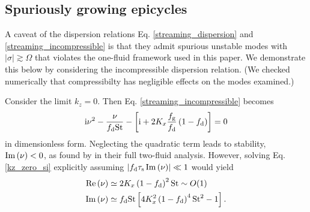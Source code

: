 \subsection{Spuriously growing epicycles}\label{spurious_epi}

A caveat of the dispersion relations 
Eq. \ref{streaming_dispersion} and \ref{streaming_incompressible} is
that they admit spurious unstable modes with $|\sigma|\gtrsim \Omega$
that violates the one-fluid framework used in this
paper. We demonstrate this below by considering the
incompressible dispersion relation. (We checked numerically that
compressibilty has negligible effects on the modes examined.) 

Consider the limit $k_z=0$. Then Eq. \ref{streaming_incompressible}
becomes 
\begin{align}      %
\ii\nu^2 - \frac{\nu}{\fdust\st} - \left[\ii + 
  2K_x\frac{\fg}{\fdust}\left(1-\fdust\right)\right]=0\label{kz_zero_si} 
\end{align} 
in dimensionless form. Neglecting the quadratic term leads to
stability, $\operatorname{Im}{(\nu)}<0$, as found by \cite{youdin05a} in their full
two-fluid analysis.  
However, solving Eq. \ref{kz_zero_si} explicitly assuming $\left|f_\mathrm{d}\tau_\mathrm{s}
\operatorname{Im}{(\nu)}\right| \ll 1$ would yield  
\begin{align}
\operatorname{Re}{(\nu)}&\simeq 2K_x\left(1-f_\mathrm{d}\right)^2\mathrm{St} \sim O(1)\\
\operatorname{Im}{(\nu)}&\simeq f_\mathrm{d} \mathrm{St} \left[4K_x^2\left(1-f_\mathrm{d}\right)^4\mathrm{St}^2 -
1\right].\label{epi_grow}
\end{align}

